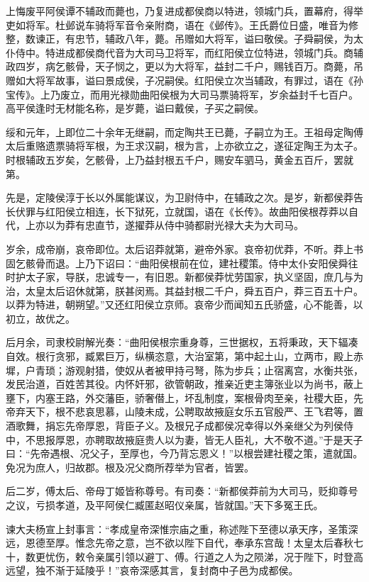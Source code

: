 \documentclass[]{article}
\begin{document}
上悔废平阿侯谭不辅政而薨也，乃复进成都侯商以特进，领城门兵，置幕府，得举吏如将军。杜邺说车骑将军音令亲附商，语在《邺传》。王氏爵位日盛，唯音为修整，数谏正，有忠节，辅政八年，薨。吊赠如大将军，谥曰敬侯。子舜嗣侯，为太仆侍中。特进成都侯商代音为大司马卫将军，而红阳侯立位特进，领城门兵。商辅政四岁，病乞骸骨，天子悯之，更以为大将军，益封二千户，赐钱百万。商薨，吊赠如大将军故事，谥曰景成侯，子况嗣侯。红阳侯立次当辅政，有罪过，语在《孙宝传》。上乃废立，而用光禄勋曲阳侯根为大司马票骑将军，岁余益封千七百户。高平侯逢时无材能名称，是岁薨，谥曰戴侯，子买之嗣侯。

绥和元年，上即位二十余年无继嗣，而定陶共王已薨，子嗣立为王。王祖母定陶傅太后重赂遗票骑将军根，为王求汉嗣，根为言，上亦欲立之，遂征定陶王为太子。时根辅政五岁矣，乞骸骨，上乃益封根五千户，赐安车驷马，黄金五百斤，罢就第。

先是，定陵侯淳于长以外属能谋议，为卫尉侍中，在辅政之次。是岁，新都侯莽告长伏罪与红阳侯立相连，长下狱死，立就国，语在《长传》。故曲阳侯根荐莽以自代，上亦以为莽有忠直节，遂擢莽从侍中骑都尉光禄大夫为大司马。

岁余，成帝崩，哀帝即位。太后诏莽就第，避帝外家。哀帝初优莽，不听。莽上书固乞骸骨而退。上乃下诏曰：``曲阳侯根前在位，建社稷策。侍中太仆安阳侯舜往时护太子家，导朕，忠诚专一，有旧恩。新都侯莽忧劳国家，执义坚固，庶几与为治，太皇太后诏休就第，朕甚闵焉。其益封根二千户，舜五百户，莽三百五十户。以莽为特进，朝朔望。''又还红阳侯立京师。哀帝少而闻知五氏骄盛，心不能善，以初立，故优之。

后月余，司隶校尉解光奏：``曲阳侯根宗重身尊，三世据权，五将秉政，天下辐凑自效。根行贪邪，臧累巨万，纵横恣意，大治室第，第中起土山，立两市，殿上赤墀，户青琐；游观射猎，使奴从者被甲持弓弩，陈为步兵；止宿离宫，水衡共张，发民治道，百姓苦其役。内怀奸邪，欲管朝政，推亲近吏主簿张业以为尚书，蔽上壅下，内塞王路，外交藩臣，骄奢僣上，坏乱制度，案根骨肉至亲，社稷大臣，先帝弃天下，根不悲哀思慕，山陵未成，公聘取故掖庭女乐五官殷严、王飞君等，置酒歌舞，捐忘先帝厚恩，背臣子义。及根兄子成都侯况幸得以外亲继父为列侯侍中，不思报厚恩，亦聘取故掖庭贵人以为妻，皆无人臣礼，大不敬不道。''于是天子曰：``先帝遇根、况父子，至厚也，今乃背忘恩义！''以根尝建社稷之策，遣就国。免况为庶人，归故郡。根及况父商所荐举为官者，皆罢。

后二岁，傅太后、帝母丁姬皆称尊号。有司奏：``新都侯莽前为大司马，贬抑尊号之议，亏损孝道，及平阿侯仁臧匿赵昭仪亲属，皆就国。''天下多冤王氏。

谏大夫杨宣上封事言：``孝成皇帝深惟宗庙之重，称述陛下至德以承天序，圣策深远，恩德至厚。惟念先帝之意，岂不欲以陛下自代，奉承东宫哉！太皇太后春秋七十，数更忧伤，敕令亲属引领以避丁、傅。行道之人为之陨涕，况于陛下，时登高远望，独不渐于延陵乎！''哀帝深感其言，复封商中子邑为成都侯。
\end{document}
